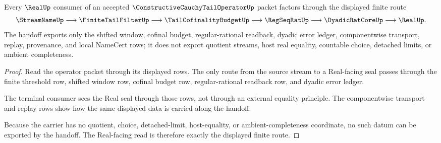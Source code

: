 \begin{theorem}
\label{thm:constructive-cauchy-tail-operator-real-seal-handoff}
Every $\RealUp$ consumer of an accepted $\ConstructiveCauchyTailOperatorUp$ packet factors through the displayed finite route
$$
\StreamNameUp \longrightarrow \FiniteTailFilterUp \longrightarrow \TailCofinalityBudgetUp \longrightarrow \RegSeqRatUp \longrightarrow \DyadicRatCoreUp \longrightarrow \RealUp .
$$
The handoff exports only the shifted window, cofinal budget, regular-rational readback, dyadic error ledger, componentwise transport, replay, provenance, and local NameCert rows; it does not export quotient streams, host real equality, countable choice, detached limits, or ambient completeness.
\end{theorem}
\begin{proof}
Read the operator packet through its displayed rows. The only route from the source stream to a Real-facing seal passes through the finite threshold row, shifted window row, cofinal budget row, regular-rational readback row, and dyadic error ledger.

The terminal consumer sees the Real seal through those rows, not through an external equality principle. The componentwise transport and replay rows show how the same displayed data is carried along the handoff.

Because the carrier has no quotient, choice, detached-limit, host-equality, or ambient-completeness coordinate, no such datum can be exported by the handoff. The Real-facing read is therefore exactly the displayed finite route.
\end{proof}




